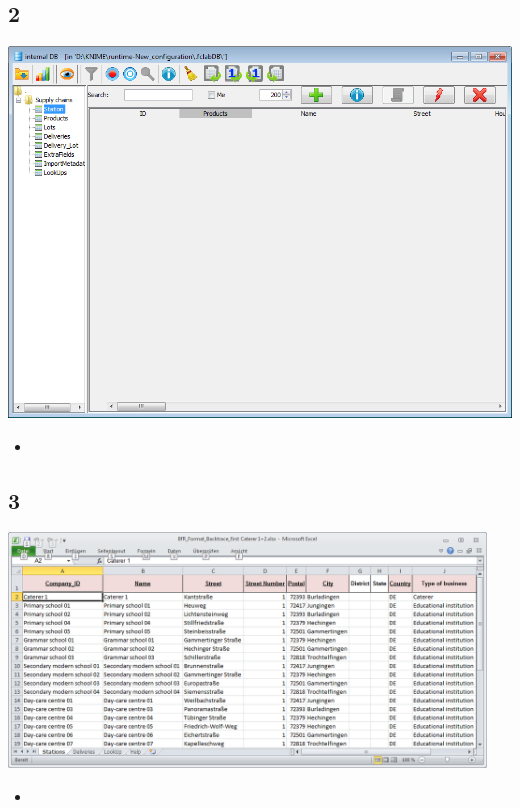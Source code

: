 \documentclass{beamer}
\begin{document}
\subsection{2}
\begin{frame}
	\begin{center}
  		\includegraphics[height=0.6\textheight]{2.png}
	\end{center}
	\begin{itemize}
		\item
	\end{itemize}
\end{frame}

\subsection{3}
\begin{frame}
	\begin{center}
  		\includegraphics[width=0.95\textwidth]{3.png}
	\end{center}
	\begin{itemize}
		\item
	\end{itemize}
\end{frame}
\end{document}
